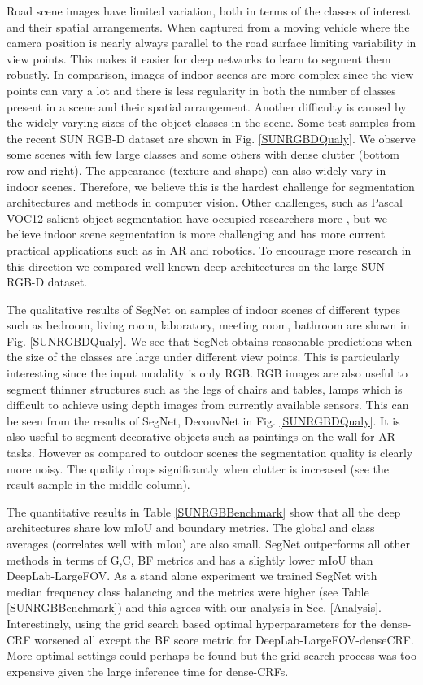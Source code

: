 \documentclass[10pt,journal,compsoc]{IEEEtran}
\begin{document}
Road scene images have limited variation, both in terms of the classes of interest and their spatial arrangements. When captured from a moving vehicle where the camera position is nearly always parallel to the road surface limiting variability in view points. This makes it easier for deep networks to learn to segment them robustly. In comparison, images of indoor scenes are more complex since the view points can vary a lot and there is less regularity in both the number of classes present in a scene and their spatial arrangement. Another difficulty is caused by the widely varying sizes of the object classes in the scene. Some test samples from the recent SUN RGB-D dataset \cite{song2015sun} are shown in Fig. \ref{SUNRGBDQualy}. We observe some scenes with few large classes and some others with dense clutter (bottom row and right). The appearance (texture and shape) can also widely vary in indoor scenes. Therefore, we believe this is the hardest challenge for segmentation architectures and methods in computer vision. Other challenges, such as Pascal VOC12 \cite{Pascal} salient object segmentation have occupied researchers  more \cite{liu2015semantic}, but we believe indoor scene segmentation is more challenging and has more current practical applications such as in AR and robotics. To encourage more research in this direction we compared well known deep architectures on the large SUN RGB-D dataset.





The qualitative results of SegNet on samples of indoor scenes of different types such as bedroom, living room, laboratory, meeting room, bathroom are shown in Fig. \ref{SUNRGBDQualy}. We see that SegNet obtains reasonable predictions when the size of the classes are large under different view points. This is particularly interesting since the input modality is only RGB. RGB images are also useful to segment thinner structures such as the legs of chairs and tables, lamps which is difficult to achieve using depth images from currently available sensors. This can be seen from the results of SegNet, DeconvNet in Fig. \ref{SUNRGBDQualy}. It is also useful to segment decorative objects such as paintings on the wall for AR tasks. However as compared to outdoor scenes the segmentation quality is clearly more noisy. The quality drops significantly when clutter is increased (see the result sample in the middle column).

The quantitative results in Table \ref{SUNRGBBenchmark} show that all the deep architectures share low mIoU and boundary metrics. The global and class averages (correlates well with mIou) are also small. SegNet outperforms all other methods in terms of G,C, BF metrics and has a slightly lower mIoU than DeepLab-LargeFOV. As a stand alone experiment we trained SegNet with median frequency class balancing \cite{eigen2014predicting} and the metrics were higher (see Table \ref{SUNRGBBenchmark}) and this agrees with our analysis in Sec. \ref{Analysis}. Interestingly, using the grid search based optimal hyperparameters for the dense-CRF worsened all except the BF score metric for DeepLab-LargeFOV-denseCRF. More optimal settings could perhaps be found but the grid search process was too expensive given the large inference time for dense-CRFs. 
\end{document}
